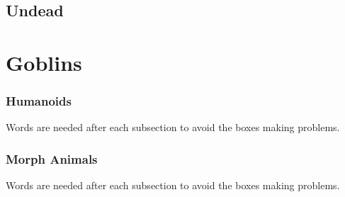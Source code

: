 \documentclass[a4paper,openany]{book}
\begin{document}
\begin{multicols}{2}

\bear

\boar

\chitincrawler

\basilisk

\wolf

\woodspy

\end{multicols}

\section{Undead}

\begin{multicols}{2}

\ghoul

\ghast

\demilich

\lich

\end{multicols}

\chapter{Goblins}

\begin{multicols}{2}

\subsection{Humanoids}
Words are needed after each subsection to avoid the boxes making problems.




\goblin

\goblin

\goblincaster

\hobgoblin

\ogre

\subsection{Morph Animals}
Words are needed after each subsection to avoid the boxes making problems.



\morphrat

\morphhorse

\morphcat

\morphslug

\morphspider

\morphwolf

\morphhuman

\end{multicols}
\end{document}
